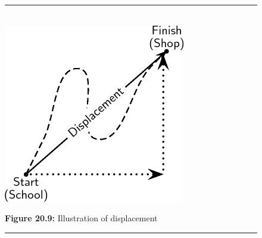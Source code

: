       
    \setcounter{subfigure}{0}


	\begin{figure}[H] %
    \begin{center}
    \rule[.1in]{\figurerulewidth}{.005in} \\
        \label{m38788*uid17!!!underscore!!!media}\label{m38788*uid17!!!underscore!!!printimage}\includegraphics[width=300px]{col11305.imgs/m38788_PG10C2_008.png} %
        
      \vspace{2pt}
    \vspace{\rubberspace}\par \begin{cnxcaption}
	  \small \textbf{Figure 20.9: }Illustration of displacement
	\end{cnxcaption}
      
    \vspace{.1in}
    \rule[.1in]{\figurerulewidth}{.005in} \\
        
    \end{center}

 \end{figure}   

    \addtocounter{footnote}{-0}
    

